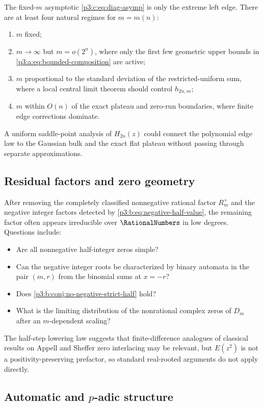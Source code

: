 \documentclass[11pt,oneside]{article}
\numberwithin{equation}{section}
\theoremstyle{definition}
\theoremstyle{remark}
\begin{document}
The fixed-$m$ asymptotic \eqref{p3:c:eq:diag-asymp} is only the extreme left edge.
There are at least four natural regimes for $m=m(n)$:
\begin{enumerate}
 \item $m$ fixed;
 \item $m\to\infty$ but $m=o(2^n)$, where only the first few geometric upper
       bounds in \eqref{p3:a:eq:bounded-composition} are active;
 \item $m$ proportional to the standard deviation of the restricted-uniform
       sum, where a local central limit theorem should control $h_{2n,m}$;
 \item $m$ within $O(n)$ of the exact plateau and zero-run boundaries, where
       finite edge corrections dominate.
\end{enumerate}
A uniform saddle-point analysis of
$H_{2n}(z)$ could connect the polynomial edge law to the Gaussian bulk and
the exact flat plateau without passing through separate approximations.

\subsection{Residual factors and zero geometry}

After removing the completely classified nonnegative rational factor
$R_m^+$ and the negative integer factors detected by
\eqref{p3:b:eq:negative-half-value}, the remaining factor often appears
irreducible over $\RationalNumbers$ in low degrees.  Questions include:
\begin{itemize}
 \item Are all nonnegative half-integer zeros simple?
 \item Can the negative integer roots be characterized by binary automata in
       the pair $(m,r)$ from the binomial sums at $x=-r$?
 \item Does \cref{p3:b:conj:no-negative-strict-half} hold?
 \item What is the limiting distribution of the nonrational complex zeros of
       $D_m$ after an $m$-dependent scaling?
\end{itemize}
The half-step lowering law suggests that finite-difference analogues of
classical results on Appell and Sheffer zero interlacing may be relevant, but
$E(z^2)$ is not a positivity-preserving prefactor, so standard real-rooted
arguments do not apply directly.

\subsection{Automatic and \texorpdfstring{$p$-adic}{p-adic} structure}
\end{document}
